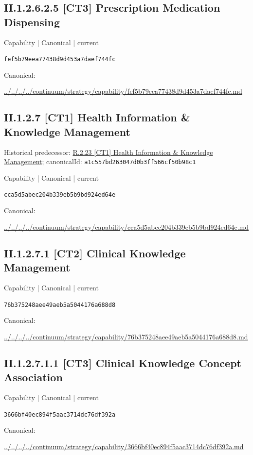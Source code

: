 \documentclass[10pt,a4paper]{article}
\begin{document}
\subsection*{II.1.2.6.2.5 [CT3] Prescription Medication Dispensing}
\label{element-fef5b79eea77438d9d453a7daef744fc}
{\small Capability | Canonical | current}\par
\texttt{fef5b79eea77438d9d453a7daef744fc}\par
Canonical: \par
{\footnotesize\url{../../../../continuum/strategy/capability/fef5b79eea77438d9d453a7daef744fc.md}}\par
\subsection*{II.1.2.7 [CT1] Health Information \& Knowledge Management}
Historical predecessor: \hyperref[element-a1c557bd263047d0b3ff566cf50b98c1]{R.2.23 [CT1] Health Information \& Knowledge Management}; canonicalId: \texttt{a1c557bd263047d0b3ff566cf50b98c1}\par
\label{element-cca5d5abec204b339eb5b9bd924ed64e}
{\small Capability | Canonical | current}\par
\texttt{cca5d5abec204b339eb5b9bd924ed64e}\par
Canonical: \par
{\footnotesize\url{../../../../continuum/strategy/capability/cca5d5abec204b339eb5b9bd924ed64e.md}}\par
\subsection*{II.1.2.7.1 [CT2] Clinical Knowledge Management}
\label{element-76b375248aee49aeb5a5044176a688d8}
{\small Capability | Canonical | current}\par
\texttt{76b375248aee49aeb5a5044176a688d8}\par
Canonical: \par
{\footnotesize\url{../../../../continuum/strategy/capability/76b375248aee49aeb5a5044176a688d8.md}}\par
\subsection*{II.1.2.7.1.1 [CT3] Clinical Knowledge Concept Association}
\label{element-3666bf40ec894f5aac3714dc76df392a}
{\small Capability | Canonical | current}\par
\texttt{3666bf40ec894f5aac3714dc76df392a}\par
Canonical: \par
{\footnotesize\url{../../../../continuum/strategy/capability/3666bf40ec894f5aac3714dc76df392a.md}}\par
\end{document}
